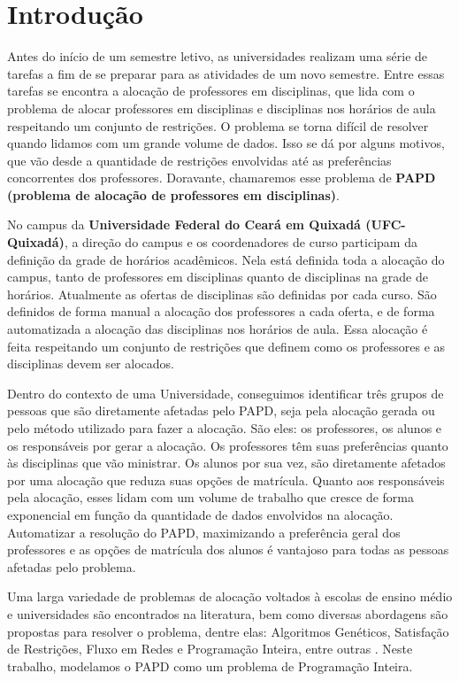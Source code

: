 \chapter{Introdução}
\label{introducao}

Antes do início de um semestre letivo, as universidades realizam uma série de tarefas a fim de se preparar para as atividades de um novo semestre. Entre essas tarefas se encontra a alocação de professores em disciplinas, que lida com o problema de alocar professores em disciplinas e disciplinas nos horários de aula respeitando um conjunto de restrições. O problema se torna difícil de resolver quando lidamos com um grande volume de dados. Isso se dá por alguns motivos, que vão desde a quantidade de restrições envolvidas até as preferências concorrentes dos professores. Doravante, chamaremos esse problema de \textbf{PAPD (problema de alocação de professores em disciplinas)}.

No campus da \textbf{Universidade Federal do Ceará em Quixadá (UFC-Quixadá)}, a direção do campus e os coordenadores de curso participam da definição da grade de horários acadêmicos. Nela está definida toda a alocação do campus, tanto de professores em disciplinas quanto de disciplinas na grade de horários. Atualmente as ofertas de disciplinas são definidas por cada curso. São definidos de forma manual a alocação dos professores a cada oferta, e de forma automatizada a alocação das disciplinas nos horários de aula. Essa alocação é feita respeitando um conjunto de restrições que definem como os professores e as disciplinas devem ser alocados.

Dentro do contexto de uma Universidade, conseguimos identificar três grupos de pessoas que são diretamente afetadas pelo PAPD, seja pela alocação gerada ou pelo método utilizado para fazer a alocação. São eles: os professores, os alunos e os responsáveis por gerar a alocação. Os professores têm suas preferências quanto às disciplinas que vão ministrar. Os alunos por sua vez, são diretamente afetados por uma alocação que reduza suas opções de matrícula. Quanto aos responsáveis pela alocação, esses lidam com um volume de trabalho que cresce de forma exponencial em função da quantidade de dados envolvidos na alocação. Automatizar a resolução do PAPD, maximizando a preferência geral dos professores e as opções de matrícula dos alunos é vantajoso para todas as pessoas afetadas pelo problema.

Uma larga variedade de problemas de alocação voltados à escolas de ensino médio e universidades são encontrados na literatura, bem como diversas abordagens são propostas para resolver o problema, dentre elas: Algoritmos Genéticos, Satisfação de Restrições, Fluxo em Redes e Programação Inteira, entre outras \cite{schaerf1999survey}. Neste trabalho, modelamos o PAPD como um problema de Programação Inteira. 

